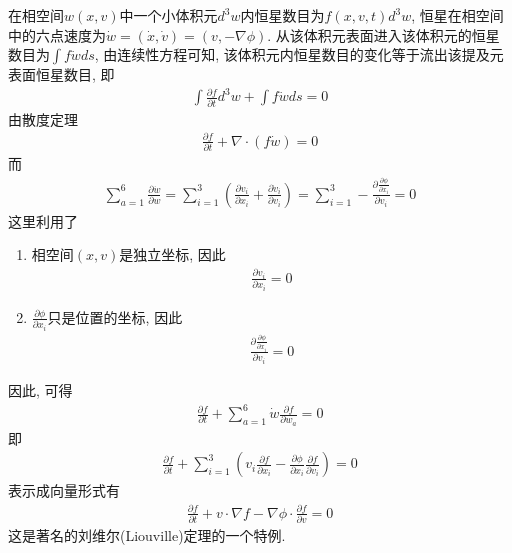 在相空间$w(x,v)$中一个小体积元$d^3 w$内恒星数目为$f(x, v, t)d^3 w$, 恒星在相空间中的六点速度为$\dot{w}=(\dot{x}, \dot{v})=(v, -\nabla \phi)$. 从该体积元表面进入该体积元的恒星数目为$\int f \dot{w}ds$, 由连续性方程可知, 该体积元内恒星数目的变化等于流出该提及元表面恒星数目, 即
\begin{align*}
    \int \frac{\partial f}{\partial t}d^3 w+\int f \dot{w}ds=0
\end{align*}
由散度定理
\begin{align*}
    \frac{\partial f}{\partial t}+\nabla\cdot (f\dot{w})=0
\end{align*}
而
\begin{align*}
    \sum_{a=1}^6\frac{\partial \dot{w}}{\partial w}=\sum_{i=1}^3\left( \frac{\partial v_i}{\partial x_i}+\frac{\partial \dot{v}_i}{\partial v_i} \right)=\sum_{i=1}^3-\frac{\partial \frac{\partial \phi}{\partial x_i}}{\partial v_i}=0
\end{align*}
这里利用了
\begin{enumerate}\small
    \item 相空间$(x,v)$是独立坐标, 因此
    \begin{align*}
        \frac{\partial v_i}{\partial x_i}=0
    \end{align*}
    \item $\frac{\partial \phi}{\partial x_i}$只是位置的坐标, 因此
    \begin{align*}
        \frac{\partial \frac{\partial \phi}{\partial x_i}}{\partial v_i}=0
    \end{align*}
\end{enumerate}
因此, 可得
\begin{align*}
    \frac{\partial f}{\partial t}+\sum_{a=1}^6\dot{w}\frac{\partial f}{\partial w_a}=0
\end{align*}
即
\begin{align*}
    \frac{\partial f}{\partial t}+\sum_{i=1}^3\left( v_i \frac{\partial f}{\partial x_i}-\frac{\partial \phi}{\partial x_i}\frac{\partial f}{\partial v_i} \right)=0
\end{align*}
表示成向量形式有
\begin{align}
    \frac{\partial f}{\partial t}+v\cdot \nabla f-\nabla \phi \cdot \frac{\partial f}{\partial v}=0 \label{D1}
\end{align}
这是著名的刘维尔(Liouville)定理的一个特例. 

